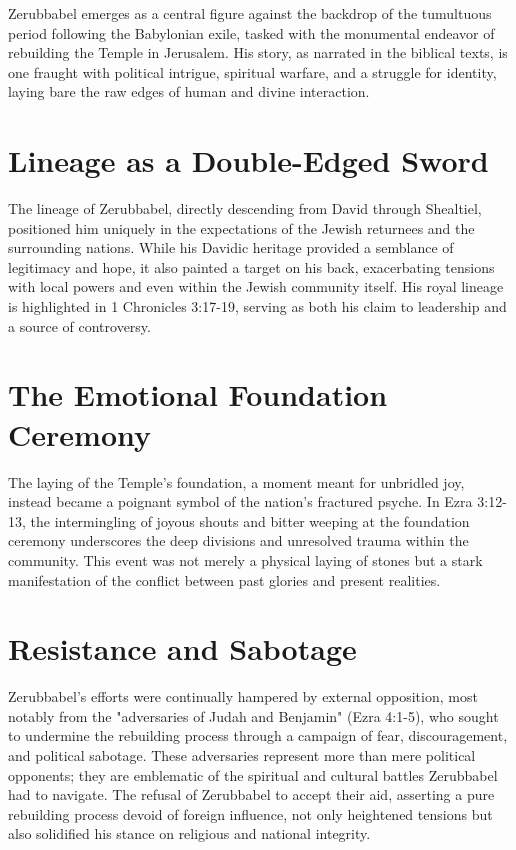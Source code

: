 Zerubbabel emerges as a central figure against the backdrop of the tumultuous period following the Babylonian exile, tasked with the monumental endeavor of rebuilding the Temple in Jerusalem. His story, as narrated in the biblical texts, is one fraught with political intrigue, spiritual warfare, and a struggle for identity, laying bare the raw edges of human and divine interaction.

\chapter{Lineage as a Double-Edged Sword}
The lineage of Zerubbabel, directly descending from David through Shealtiel, positioned him uniquely in the expectations of the Jewish returnees and the surrounding nations. While his Davidic heritage provided a semblance of legitimacy and hope, it also painted a target on his back, exacerbating tensions with local powers and even within the Jewish community itself. His royal lineage is highlighted in 1 Chronicles 3:17-19, serving as both his claim to leadership and a source of controversy.

\chapter{The Emotional Foundation Ceremony}
The laying of the Temple's foundation, a moment meant for unbridled joy, instead became a poignant symbol of the nation's fractured psyche. In Ezra 3:12-13, the intermingling of joyous shouts and bitter weeping at the foundation ceremony underscores the deep divisions and unresolved trauma within the community. This event was not merely a physical laying of stones but a stark manifestation of the conflict between past glories and present realities.

\chapter{Resistance and Sabotage}
Zerubbabel's efforts were continually hampered by external opposition, most notably from the "adversaries of Judah and Benjamin" (Ezra 4:1-5), who sought to undermine the rebuilding process through a campaign of fear, discouragement, and political sabotage. These adversaries represent more than mere political opponents; they are emblematic of the spiritual and cultural battles Zerubbabel had to navigate. The refusal of Zerubbabel to accept their aid, asserting a pure rebuilding process devoid of foreign influence, not only heightened tensions but also solidified his stance on religious and national integrity.

